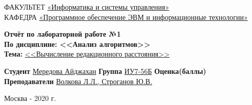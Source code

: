 \documentclass[a4paper]{article}
\begin{document}
\begin{titlepage}
		
		\doublespacing \small \raggedright ФАКУЛЬТЕТ \hspace{25mm} \underline { «Информатика и системы управления»}\\
		КАФЕДРА \hspace{5mm} \underline {«Программное обеспечение ЭВМ и информационные технологии»}\\
		
		\vspace{30mm}
		\begin{center}
		\textbf{Отчёт по лабораторной работе №1}\\
		{\bf	По дисциплине: <<Анализ алгоритмов>>}\\
		{\bf Тема:} \underline {<<Вычисление редакционного расстояния>>}\\
		\end{center}
		\begin{flushleft}
			{\bf Студент}  \underline{Мередова Айджахан}\underline {\hspace{7cm}}
			\newline
			{\bf Группа} \underline{ИУ7-56Б}\underline {\hspace{10cm}}
			\newline
			{\bf Оценка(баллы)} \underline {\hspace{10cm}}\\
			{\bf Преподаватели} \underline {Волкова Л.Л., Строганов Ю.В.}
		\end{flushleft}
		
		\vfill
		
		\centering Москва - 2020 г.\\
	\end{titlepage}
\end{document}
